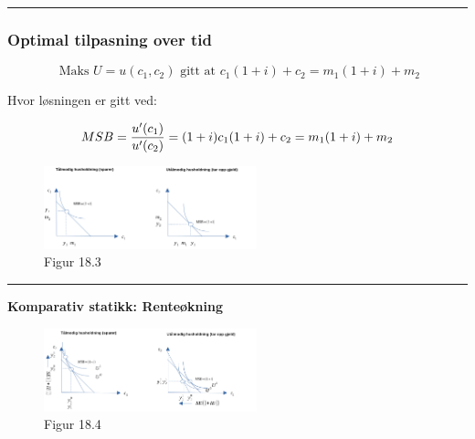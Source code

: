 \documentclass[
  letterpaper,
  DIV=11,
  numbers=noendperiod]{scrartcl}
\begin{document}
\begin{center}\rule{0.5\linewidth}{0.5pt}\end{center}

\subsubsection{Optimal tilpasning over
tid}\label{optimal-tilpasning-over-tid}

\begin{equation*}
\text{ Maks } U = u(c_1,c_2) \text{ gitt at } c_1(1+i)+ c_2 = m_1(1+i)+ m_2 
\end{equation*}

Hvor løsningen er gitt ved:

\begin{equation*}
MSB = \frac{u'(c_1)}{u'(c_2)} = (1+i) \\
c_1(1+i)+ c_2 = m_1(1+i)+ m_2 
\end{equation*}

\begin{figure}[H]

{\centering \includegraphics[width=0.55\textwidth,height=\textheight]{drawio/opt_tilpasning.png}

}

\caption{Figur 18.3}

\end{figure}%

\begin{center}\rule{0.5\linewidth}{0.5pt}\end{center}

\textbf{Komparativ statikk: Renteøkning}

\begin{figure}[H]

{\centering \includegraphics[width=0.55\textwidth,height=\textheight]{drawio/int_tilpasning_renteokning.png}

}

\caption{Figur 18.4}

\end{figure}%
\end{document}
